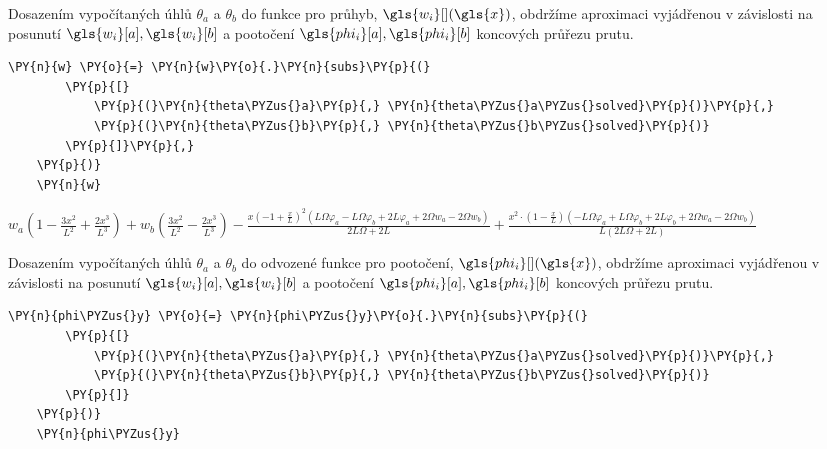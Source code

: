 \vspace{0.3cm}
Dosazením vypočítaných úhlů $\theta_a$ a $\theta_b$ do funkce pro průhyb, $\gls{w_i}[ ](\gls{x})$, obdržíme aproximaci vyjádřenou v závislosti na posunutí $\gls{w_i}[a], \gls{w_i}[b]$ a pootočení $\gls{phi_i}[a], \gls{phi_i}[b]$ koncových průřezu prutu.

\begin{tcolorbox}[breakable, size=fbox, boxrule=1pt, pad at break*=1mm,colback=cellbackground, colframe=cellborder]
    \begin{Verbatim}[commandchars=\\\{\}]
    \PY{n}{w} \PY{o}{=} \PY{n}{w}\PY{o}{.}\PY{n}{subs}\PY{p}{(}
        \PY{p}{[}
            \PY{p}{(}\PY{n}{theta\PYZus{}a}\PY{p}{,} \PY{n}{theta\PYZus{}a\PYZus{}solved}\PY{p}{)}\PY{p}{,}
            \PY{p}{(}\PY{n}{theta\PYZus{}b}\PY{p}{,} \PY{n}{theta\PYZus{}b\PYZus{}solved}\PY{p}{)}
        \PY{p}{]}\PY{p}{,}
    \PY{p}{)}
    \PY{n}{w}
    \end{Verbatim}
\end{tcolorbox}
     
                
    
    $\displaystyle w_{a} \left(1 - \frac{3 x^{2}}{L^{2}} + \frac{2 x^{3}}{L^{3}}\right) + w_{b} \left(\frac{3 x^{2}}{L^{2}} - \frac{2 x^{3}}{L^{3}}\right) - \frac{x \left(-1 + \frac{x}{L}\right)^{2} \left(L \Omega \varphi_{a} - L \Omega \varphi_{b} + 2 L \varphi_{a} + 2 \Omega w_{a} - 2 \Omega w_{b}\right)}{2 L \Omega + 2 L} + \frac{x^{2} \cdot \left(1 - \frac{x}{L}\right) \left(- L \Omega \varphi_{a} + L \Omega \varphi_{b} + 2 L \varphi_{b} + 2 \Omega w_{a} - 2 \Omega w_{b}\right)}{L \left(2 L \Omega + 2 L\right)}$
    
\vspace{0.3cm}
Dosazením vypočítaných úhlů $\theta_a$ a $\theta_b$ do odvozené funkce pro pootočení, $\gls{phi_i}[ ](\gls{x})$, obdržíme aproximaci vyjádřenou v závislosti na posunutí $\gls{w_i}[a], \gls{w_i}[b]$ a pootočení $\gls{phi_i}[a], \gls{phi_i}[b]$ koncových průřezu prutu.       

\begin{tcolorbox}[breakable, size=fbox, boxrule=1pt, pad at break*=1mm,colback=cellbackground, colframe=cellborder]
    \begin{Verbatim}[commandchars=\\\{\}]
    \PY{n}{phi\PYZus{}y} \PY{o}{=} \PY{n}{phi\PYZus{}y}\PY{o}{.}\PY{n}{subs}\PY{p}{(}
        \PY{p}{[}
            \PY{p}{(}\PY{n}{theta\PYZus{}a}\PY{p}{,} \PY{n}{theta\PYZus{}a\PYZus{}solved}\PY{p}{)}\PY{p}{,}
            \PY{p}{(}\PY{n}{theta\PYZus{}b}\PY{p}{,} \PY{n}{theta\PYZus{}b\PYZus{}solved}\PY{p}{)}
        \PY{p}{]}
    \PY{p}{)}
    \PY{n}{phi\PYZus{}y}
    \end{Verbatim}
\end{tcolorbox}
     

